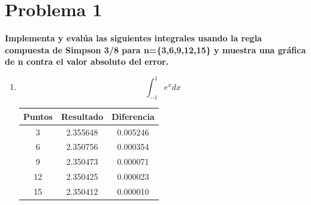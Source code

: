 \section*{Problema 1}
\textbf{Implementa y evalúa las siguientes integrales usando la regla compuesta de Simpson 3/8 para n=\{3,6,9,12,15\} y muestra una gráfica de n contra el valor absoluto del error.}

\begin{enumerate}
    \item \begin{equation*}
              \int_{-1}^1 e^x dx
          \end{equation*}
          \begin{table}[H]
              \centering
              \begin{tabular}{ccc} \hline
                  \textbf{Puntos} & \textbf{Resultado} & \textbf{Diferencia} \\ \hline
                  3               & 2.355648           & 0.005246            \\
                  6               & 2.350756           & 0.000354            \\
                  9               & 2.350473           & 0.000071            \\
                  12              & 2.350425           & 0.000023            \\
                  15              & 2.350412           & 0.000010            \\ \hline
              \end{tabular}
          \end{table}


\end{enumerate}
